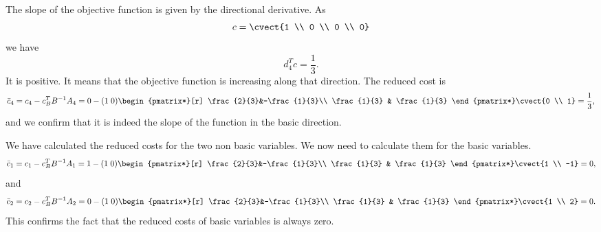 \begin{center}
\end{center}

The slope of the objective function is given by the directional
derivative. As
\[
c = \cvect{1 \\ 0 \\ 0 \\ 0}
\]
we have
\[
d_4^T c = \frac{1}{3}.
\]
It is positive. It means that the objective function is increasing
along that direction. 
The reduced cost is
\[
\bar{c}_4 = c_4 - c_B^T B^{-1} A_4 = 0 - (1 \; 0) \begin{pmatrix*}[r]
\frac{2}{3}&-\frac{1}{3}\\
\frac{1}{3} & \frac{1}{3}
\end{pmatrix*} \cvect{0 \\ 1} = \frac{1}{3},
\]
and we confirm that it is indeed the slope of the function in the
basic direction. 

We have calculated the reduced costs for the two non basic
variables. We now need to calculate them for the basic variables.
\[
\bar{c}_1 = c_1 - c_B^T B^{-1} A_1 = 1 - (1 \; 0) \begin{pmatrix*}[r]
\frac{2}{3}&-\frac{1}{3}\\
\frac{1}{3} & \frac{1}{3}
\end{pmatrix*} \cvect{1 \\ -1} = 0,
\]
and
\[
\bar{c}_2 = c_2 - c_B^T B^{-1} A_2 = 0 - (1 \; 0) \begin{pmatrix*}[r]
\frac{2}{3}&-\frac{1}{3}\\
\frac{1}{3} & \frac{1}{3}
\end{pmatrix*} \cvect{1 \\ 2} = 0.
\]
This confirms the fact that the reduced costs of basic variables is
always zero.

